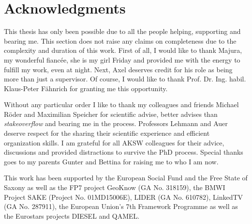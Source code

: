 



\bigskip

\begingroup
\let\clearpage\relax
\let\cleardoublepage\relax
\let\cleardoublepage\relax
\chapter*{Acknowledgments}
This thesis has only been possible due to all the people helping, supporting and bearing me.
This section does not raise any claims on completeness due to the complexity and duration of this work.
First of all, I would like to thank Majura, my wonderful fiancée, she is my girl Friday and provided me with the energy to fulfill my work, even at night.
Next, Axel deserves credit for his role as being more than just a supervisor. 
Of course, I would like to thank Prof. Dr. Ing. habil. Klaus-Peter F\"ahnrich for granting me this opportunity.
 
\bigskip

Without any particular order I like to thank my colleagues and friends Michael Röder and Maximilian Speicher for scientific advise, better advises than \emph{stakeoverflow} and bearing me in the process. 
Professors Lehmann and Auer deserve respect for the sharing their scientific experience and efficient organization skills. 
I am grateful for all AKSW colleagues for their advice, discussions and provided distractions to survive the PhD process. 
Special thanks goes to my parents Gunter and Bettina for raising me to who I am now. 


\bigskip


This work has been supported by the European Social Fund and the Free State of Saxony as well as the FP7 project GeoKnow (GA No. 318159), the BMWI Project SAKE (Project No. 01MD15006E), LIDER (GA No. 610782), LinkedTV (GA No. 287911), the European Union's 7th Framework Programme as well as the Eurostars projects DIESEL and QAMEL.


\endgroup



